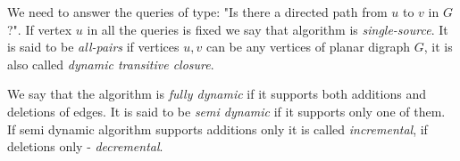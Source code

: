 We need to answer the queries of type: "Is there a directed path
from $u$ to $v$ in $G$?". If vertex $u$ in all the queries is fixed we say that algorithm is \textit{single-source}. It is said to be \textit{all-pairs} if vertices $u, v$ can be any vertices of planar digraph $G$, it is also called \textit{dynamic transitive closure}.

We say that the algorithm is \textit{fully dynamic} if it supports both additions and deletions of edges. It is said to be \textit{semi dynamic} if it supports only one of them. If semi dynamic algorithm supports additions only it is called \textit{incremental}, if deletions only - \textit{decremental}.





